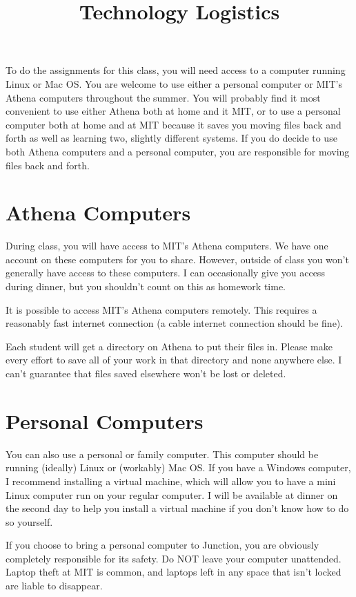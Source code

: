 \documentclass{article}
\title{Technology Logistics}
\begin{document}
\maketitle

To do the assignments for this class, you will need access to a computer running Linux or Mac OS.  You are welcome to use either a personal computer or MIT's Athena computers throughout the summer.  You will probably find it most convenient to use either Athena both at home and it MIT, or to use a personal computer both at home and at MIT because it saves you moving files back and forth as well as learning two, slightly different systems.  If you do decide to use both Athena computers and a personal computer, you are responsible for moving files back and forth.

\section*{Athena Computers}
During class, you will have access to MIT's Athena computers.  We have one account on these computers for you to share.  However, outside of class you won't generally have access to these computers.  I can occasionally give you access during dinner, but you shouldn't count on this as homework time.

It is possible to access MIT's Athena computers remotely.  This requires a reasonably fast internet connection (a cable internet connection should be fine).

Each student will get a directory on Athena to put their files in.  Please make every effort to save all of your work in that directory and none anywhere else.  I can't guarantee that files saved elsewhere won't be lost or deleted.

\section*{Personal Computers}
You can also use a personal or family computer.  This computer should be running (ideally) Linux or (workably) Mac OS.  If you have a Windows computer, I recommend installing a virtual machine, which will allow you to have a mini Linux computer run on your regular computer.  I will be available at dinner on the second day to help you install a virtual machine if you don't know how to do so yourself.

If you choose to bring a personal computer to Junction, you are obviously completely responsible for its safety.  Do NOT leave your computer unattended.  Laptop theft at MIT is common, and laptops left in any space that isn't locked are liable to disappear.
\end{document}
